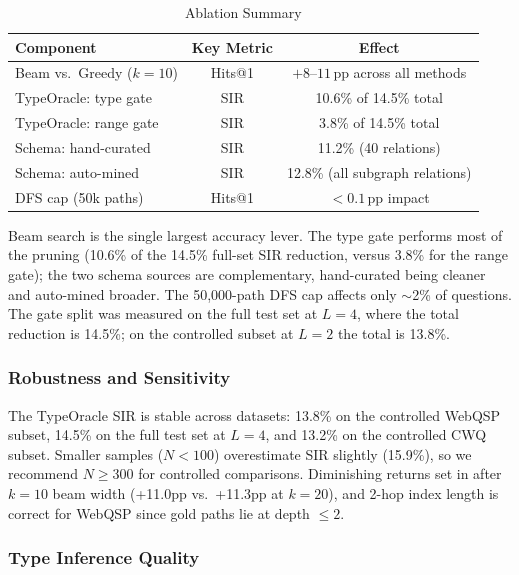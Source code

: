\begin{table}[H]
  \centering
  \caption[Ablation Summary]{Ablation Summary}
  \label{tab:ablation_summary}
  \begin{tabularx}{\textwidth}{|X|c|c|}
    \hline
    \textbf{Component} & \textbf{Key Metric} & \textbf{Effect} \\
    \hline
    Beam vs.\ Greedy ($k{=}10$) & Hits@1 & $+8$--$11$\,pp across all methods \\
    \hline
    TypeOracle: type gate  & SIR & 10.6\% of 14.5\% total \\
    \hline
    TypeOracle: range gate & SIR & 3.8\% of 14.5\% total \\
    \hline
    Schema: hand-curated   & SIR & 11.2\% (40 relations) \\
    \hline
    Schema: auto-mined     & SIR & 12.8\% (all subgraph relations) \\
    \hline
    DFS cap (50k paths)    & Hits@1 & $<0.1$\,pp impact \\
    \hline
  \end{tabularx}
\end{table}

Beam search is the single largest accuracy lever. The type gate performs most of the pruning (10.6\% of the 14.5\% full-set SIR reduction, versus 3.8\% for the range gate); the two schema sources are complementary, hand-curated being cleaner and auto-mined broader. The 50,000-path DFS cap affects only $\sim$2\% of questions. The gate split was measured on the full test set at $L{=}4$, where the total reduction is 14.5\%; on the controlled subset at $L{=}2$ the total is 13.8\%.

\subsubsection{Robustness and Sensitivity}

The TypeOracle SIR is stable across datasets: 13.8\% on the controlled WebQSP subset, 14.5\% on the full test set at $L{=}4$, and 13.2\% on the controlled CWQ subset. Smaller samples ($N{<}100$) overestimate SIR slightly (15.9\%), so we recommend $N{\geq}300$ for controlled comparisons. Diminishing returns set in after $k{=}10$ beam width (+11.0pp vs.\ +11.3pp at $k{=}20$), and 2-hop index length is correct for WebQSP since gold paths lie at depth $\leq 2$.

\subsubsection{Type Inference Quality}

